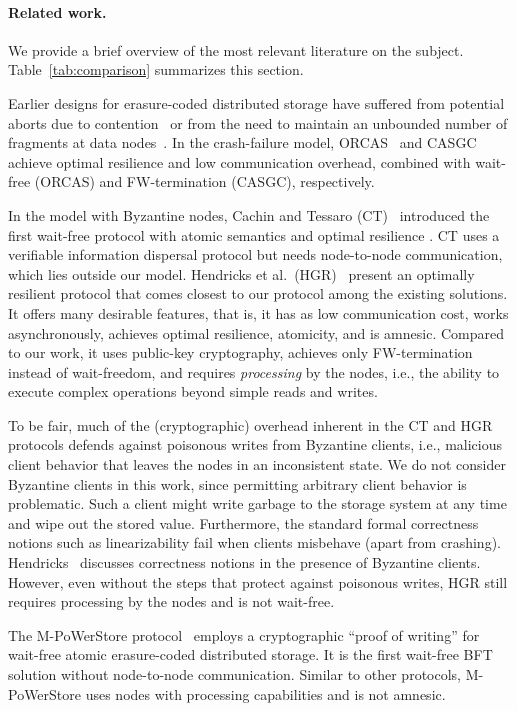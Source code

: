 \documentclass[oribibl]{llncs}
\theoremstyle{definition-boldhead}
\newcommand{\node}{node\xspace}
\newcommand{\nodes}{nodes\xspace}
\begin{document}
\paragraph{Related work.}

We provide a brief overview of the most relevant literature on the
subject.  Table~\ref{tab:comparison} summarizes this section.

Earlier designs for erasure-coded distributed storage have suffered
from potential aborts due to contention~\cite{fmssv04} or from
the need to maintain an unbounded number of fragments at data
\nodes~\cite{gwgr04}.
In the crash-failure model, ORCAS~\cite{dugule08} and
CASGC~\cite{clmm13} achieve optimal resilience  and low
communication overhead, combined with wait-free (ORCAS)
and FW-termination (CASGC), respectively.

In the model with Byzantine \nodes, Cachin and Tessaro
(CT)~\cite{cactes06} introduced the first wait-free protocol with
atomic semantics and optimal resilience .  CT uses a
verifiable information dispersal protocol but needs \node-to-\node
communication, which lies outside our model. Hendricks et al.~(HGR)~\cite{hegare07b} present an optimally resilient
protocol that comes closest to our protocol among the existing
solutions.  It offers many desirable features, that is, it has as
low communication cost, works asynchronously, achieves optimal
resilience, atomicity, and is amnesic.  Compared to our work, it uses
public-key cryptography, achieves only FW-termination instead of
wait-freedom, and requires \emph{processing} by the \nodes, i.e., the
ability to execute complex operations beyond simple reads and writes.

To be fair, much of the (cryptographic) overhead inherent in the CT
and HGR protocols defends against poisonous writes from Byzantine
clients, i.e., malicious client behavior that leaves the \nodes in
an inconsistent state.  We do not consider Byzantine clients in this
work, since permitting arbitrary client behavior is problematic.  Such
a client might write garbage to the storage system at any time and
wipe out the stored value.
\if\submit\no
Furthermore, the standard formal
correctness notions such as linearizability fail when clients
misbehave (apart from crashing).  Hendricks~\cite{hendri09} discusses
correctness notions in the presence of Byzantine clients.
\fi
However,
even without the steps that protect against poisonous writes, HGR still
requires processing by the \nodes and is not wait-free.

The M-PoWerStore protocol~\cite{dklmsv13} employs a cryptographic
``proof of writing'' for wait-free atomic erasure-coded distributed
storage.  It is the first wait-free BFT solution without
\node-to-\node communication.  Similar to other protocols,
M-PoWerStore uses \nodes with processing capabilities and is not
amnesic.
\end{document}
